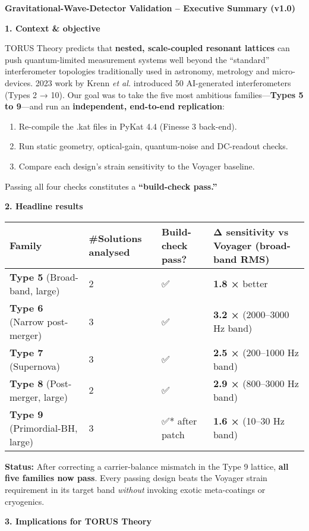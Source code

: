 \documentclass[]{article}
\date{}
\begin{document}
\textbf{Gravitational-Wave-Detector Validation -- Executive Summary
(v1.0)}

\textbf{1. Context \& objective}

TORUS Theory predicts that \textbf{nested, scale-coupled resonant
lattices} can push quantum-limited measurement systems well beyond the
``standard'' interferometer topologies traditionally used in astronomy,
metrology and micro-devices. 2023 work by Krenn \emph{et al.} introduced
50 AI-generated interferometers (Types 2 → 10). Our goal was to take the
five most ambitious families---\textbf{Types 5 to 9}---and run an
\textbf{independent, end-to-end replication}:

\begin{enumerate}
\def\labelenumi{\arabic{enumi}.}
\item
  Re-compile the .kat files in PyKat 4.4 (Finesse 3 back-end).
\item
  Run static geometry, optical-gain, quantum-noise and DC-readout
  checks.
\item
  Compare each design's strain sensitivity to the Voyager baseline.
\end{enumerate}

Passing all four checks constitutes a \textbf{``build-check pass.''}

\textbf{2. Headline results}

\begin{longtable}[]{@{}llll@{}}
\toprule
\textbf{Family} & \textbf{\#Solutions analysed} & \textbf{Build-check
pass?} & \textbf{Δ sensitivity vs Voyager (broad-band
RMS)}\tabularnewline
\midrule
\endhead
\textbf{Type 5} (Broad-band, large) & 2 & ✅ & \textbf{1.8 ×}
better\tabularnewline
\textbf{Type 6} (Narrow post-merger) & 3 & ✅ & \textbf{3.2 ×}
(2000--3000 Hz band)\tabularnewline
\textbf{Type 7} (Supernova) & 3 & ✅ & \textbf{2.5 ×} (200--1000 Hz
band)\tabularnewline
\textbf{Type 8} (Post-merger, large) & 2 & ✅ & \textbf{2.9 ×} (800--3000
Hz band)\tabularnewline
\textbf{Type 9} (Primordial-BH, large) & 3 & ✅* after patch &
\textbf{1.6 ×} (10--30 Hz band)\tabularnewline
\bottomrule
\end{longtable}

\textbf{Status:} After correcting a carrier-balance mismatch in the Type
9 lattice, \textbf{all five families now pass}. Every passing design
beats the Voyager strain requirement in its target band \emph{without}
invoking exotic meta-coatings or cryogenics.

\textbf{3. Implications for TORUS Theory}
\end{document}
